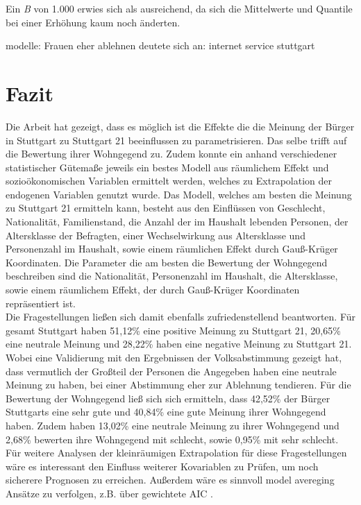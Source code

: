 \documentclass{Vorlage}
\begin{document}
Ein \textit{B} von 1.000 erwies sich als ausreichend, da sich die Mittelwerte und Quantile bei einer Erhöhung kaum noch änderten.

modelle: Frauen eher ablehnen deutete sich an: internet service stuttgart

\newpage
\section{Fazit}
Die Arbeit hat gezeigt, dass es möglich ist die Effekte die die Meinung der Bürger in Stuttgart zu Stuttgart 21 beeinflussen zu parametrisieren. Das selbe trifft auf die Bewertung ihrer Wohngegend zu. Zudem konnte ein anhand verschiedener statistischer Gütemaße jeweils ein bestes Modell aus räumlichem Effekt und sozioökonomischen Variablen ermittelt werden, welches zu Extrapolation der endogenen Variablen genutzt wurde. Das Modell, welches am besten die Meinung zu Stuttgart 21 ermitteln kann, besteht aus den Einflüssen von Geschlecht, Nationalität, Familienstand, die Anzahl der im Haushalt lebenden Personen, der Altersklasse der Befragten, einer Wechselwirkung aus Altersklasse und  Personenzahl im Haushalt, sowie einem räumlichen Effekt durch Gauß-Krüger Koordinaten. Die Parameter die am besten die Bewertung der Wohngegend beschreiben sind die Nationalität, Personenzahl im Haushalt, die Altersklasse, sowie einem räumlichem Effekt, der durch Gauß-Krüger Koordinaten repräsentiert ist. \\
Die Fragestellungen ließen sich damit ebenfalls zufriedenstellend beantworten. Für gesamt Stuttgart haben 51,12\% eine positive Meinung zu Stuttgart 21, 20,65\% eine neutrale Meinung und 28,22\% haben eine negative Meinung zu Stuttgart 21. Wobei eine Validierung mit den Ergebnissen der Volksabstimmung gezeigt hat, dass vermutlich der Großteil der Personen die Angegeben haben eine neutrale Meinung zu haben, bei einer Abstimmung eher zur Ablehnung tendieren. Für die Bewertung der Wohngegend ließ sich sich ermitteln, dass 42,52\% der Bürger Stuttgarts eine sehr gute und 40,84\% eine gute Meinung ihrer Wohngegend haben. Zudem haben 13,02\% eine neutrale Meinung zu ihrer Wohngegend und 2,68\% bewerten ihre Wohngegend mit schlecht, sowie 0,95\% mit sehr schlecht.\\
Für weitere Analysen der kleinräumigen Extrapolation für diese Fragestellungen wäre es interessant den Einfluss weiterer Kovariablen zu Prüfen, um noch sicherere Prognosen zu erreichen. Außerdem wäre es sinnvoll model avereging Ansätze zu verfolgen, z.B. über gewichtete AIC \cite{WAIC}.
\end{document}
